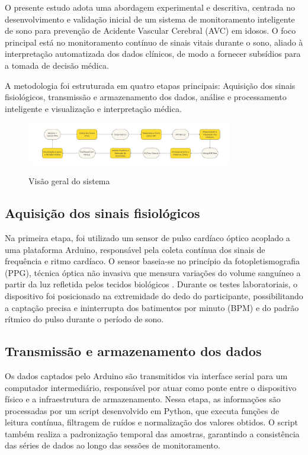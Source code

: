 O presente estudo adota uma abordagem experimental e descritiva, centrada no desenvolvimento e validação inicial de um sistema de monitoramento inteligente de sono para prevenção de Acidente Vascular Cerebral (AVC) em idosos. O foco principal está no monitoramento contínuo de sinais vitais durante o sono, aliado à interpretação automatizada dos dados clínicos, de modo a fornecer subsídios para a tomada de decisão médica.

A metodologia foi estruturada em quatro etapas principais: Aquisição dos sinais fisiológicos, transmissão e armazenamento dos dados, análise e processamento inteligente e visualização e interpretação médica.\\

\begin{figure}[!htb]
\centering
\caption{Visão geral do sistema}
\label{fig:metodologia-sistema}
\includegraphics[width=0.8\textwidth]{Illustrations/Fluxograma.jpg}\\
\end{figure}

\subsection*{Aquisição dos sinais fisiológicos}

Na primeira etapa, foi utilizado um sensor de pulso cardíaco óptico acoplado a uma plataforma Arduino, responsável pela coleta contínua dos sinais de frequência e ritmo cardíaco. O sensor baseia-se no princípio da fotopletismografia (PPG), técnica óptica não invasiva que mensura variações do volume sanguíneo a partir da luz refletida pelos tecidos biológicos \parencite{TimarFulepPPG,Charlton2023}. Durante os testes laboratoriais, o dispositivo foi posicionado na extremidade do dedo do participante, possibilitando a captação precisa e ininterrupta dos batimentos por minuto (BPM) e do padrão rítmico do pulso durante o período de sono.

\subsection*{Transmissão e armazenamento dos dados}

Os dados captados pelo Arduino são transmitidos via interface serial para um computador intermediário, responsável por atuar como ponte entre o dispositivo físico e a infraestrutura de armazenamento. Nessa etapa, as informações são processadas por um script desenvolvido em Python, que executa funções de leitura contínua, filtragem de ruídos e normalização dos valores obtidos. O script também realiza a padronização temporal das amostras, garantindo a consistência das séries de dados ao longo das sessões de monitoramento.

